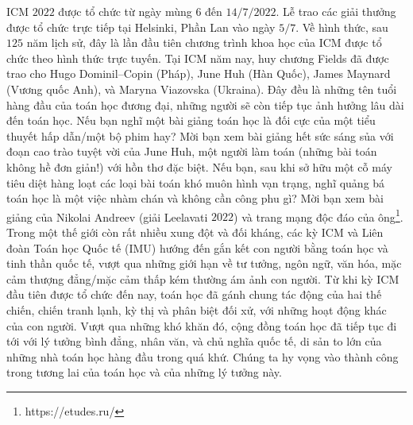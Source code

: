 \begin{multicols}{2}
	ICM $2022$ được tổ chức từ ngày mùng $6$ đến $14/7/2022$. Lễ trao các giải thưởng được tổ chức trực tiếp tại Helsinki, Phần Lan vào ngày $5/7$. Về hình thức, sau $125$ năm lịch sử, đây là lần đầu tiên chương trình khoa học của ICM được tổ chức theo hình thức trực tuyến. Tại ICM năm nay, huy chương Fields đã được trao cho Hugo Dominil--Copin (Pháp), June Huh (Hàn Quốc), James Maynard (Vương quốc Anh), và Maryna Viazovska (Ukraina). Đây đều là những tên tuổi hàng đầu của toán học đương đại, những người sẽ còn tiếp tục ảnh hưởng lâu dài đến toán học. Nếu bạn nghĩ một bài giảng toán học là đối cực của một tiểu thuyết hấp dẫn/một bộ phim hay? Mời bạn xem bài giảng hết sức sáng sủa với đoạn cao trào tuyệt vời của June Huh, một người làm toán (những bài toán không hề đơn giản!) với hồn thơ đặc biệt. Nếu bạn, sau khi sở hữu một cỗ máy tiêu diệt hàng loạt các loại bài toán khó muôn hình vạn trạng, nghĩ quảng bá toán học là một việc nhàm chán và không cần công phu gì? Mời bạn xem bài giảng của Nikolai Andreev (giải Leelavati $2022$) và trang mạng độc đáo của ông\footnote{\color{doisongtoanhoc}https://etudes.ru/}.
	\vskip 0.1cm
	Trong một thế giới còn rất nhiều xung đột và đối kháng, các kỳ ICM và Liên đoàn Toán học Quốc tế (IMU) hướng đến gắn kết con người bằng toán học và tinh thần quốc tế, vượt qua những giới hạn về tư tưởng, ngôn ngữ, văn hóa, mặc cảm thượng đẳng/mặc cảm thấp kém thường ám ảnh con người. Từ khi kỳ ICM đầu tiên được tổ chức đến nay, toán học đã gánh chung tác động của hai thế chiến, chiến tranh lạnh, kỳ thị và phân biệt đối xử, với những hoạt động khác của con người. Vượt qua những khó khăn đó, cộng đồng toán học đã tiếp tục đi tới với lý tưởng bình đẳng, nhân văn, và chủ nghĩa quốc tế, di sản to lớn của những nhà toán học hàng đầu trong quá khứ. Chúng ta hy vọng vào thành công trong tương lai của toán học và của những lý tưởng này.
\end{multicols}
